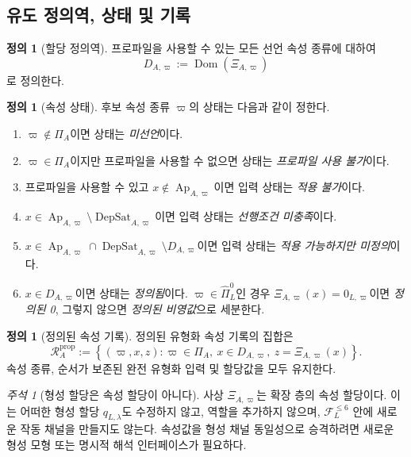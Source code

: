 \documentclass[11pt]{article}
\newcommand{\FVI}{\mathcal F_{L}^{\le 6}}
\newcommand{\PiZero}{\widehat{\Pi}_{L}^{0}}
\newcommand{\Ap}{\operatorname{Ap}}
\newcommand{\DepSat}{\operatorname{DepSat}}
\newcommand{\Dom}{\operatorname{Dom}}
\newcommand{\PropRec}{\mathcal R^{\mathrm{prop}}}
\theoremstyle{definition}
\newtheorem{definition}[theorem]{정의}
\theoremstyle{remark}
\newtheorem{remark}[theorem]{주석}
\begin{document}
\subsection{유도 정의역, 상태 및 기록}

\begin{definition}[할당 정의역]
프로파일을 사용할 수 있는 모든 선언 속성 종류에 대하여
\[
D_{A,\varpi}:=\Dom(\Xi_{A,\varpi})
\]
로 정의한다.
\end{definition}

\begin{definition}[속성 상태]
\label{def:status}
후보 속성 종류 \(\varpi\)의 상태는 다음과 같이 정한다.
\begin{enumerate}[label=(\arabic*)]
\item \(\varpi\notin\Pi_A\)이면 상태는 \emph{미선언}이다.
\item \(\varpi\in\Pi_A\)이지만 프로파일을 사용할 수 없으면 상태는 \emph{프로파일 사용 불가}이다.
\item 프로파일을 사용할 수 있고 \(x\notin\Ap_{A,\varpi}\)이면 입력 상태는 \emph{적용 불가}이다.
\item \(x\in\Ap_{A,\varpi}\setminus\DepSat_{A,\varpi}\)이면 입력 상태는 \emph{선행조건 미충족}이다.
\item \(x\in\Ap_{A,\varpi}\cap\DepSat_{A,\varpi}\setminus D_{A,\varpi}\)이면 입력 상태는 \emph{적용 가능하지만 미정의}이다.
\item \(x\in D_{A,\varpi}\)이면 상태는 \emph{정의됨}이다. \(\varpi\in\PiZero\)인 경우 \(\Xi_{A,\varpi}(x)=0_{L,\varpi}\)이면 \emph{정의된 0}, 그렇지 않으면 \emph{정의된 비영값}으로 세분한다.
\end{enumerate}
\end{definition}

\begin{definition}[정의된 속성 기록]
정의된 유형화 속성 기록의 집합은
\[
\PropRec_A:=
\left\{
(\varpi,x,z):
\varpi\in\Pi_A,
\ x\in D_{A,\varpi},
\ z=\Xi_{A,\varpi}(x)
\right\}.
\]
속성 종류, 순서가 보존된 완전 유형화 입력 및 할당값을 모두 유지한다.
\end{definition}

\begin{remark}[형성 할당은 속성 할당이 아니다]
사상 \(\Xi_{A,\varpi}\)는 확장 층의 속성 할당이다.
이는 어떠한 형성 할당 \(q_{L,\lambda}\)도 수정하지 않고, 역할을 추가하지 않으며, \(\FVI\) 안에 새로운 작동 채널을 만들지도 않는다.
속성값을 형성 채널 동일성으로 승격하려면 새로운 형성 모형 또는 명시적 해석 인터페이스가 필요하다.
\end{remark}
\end{document}
